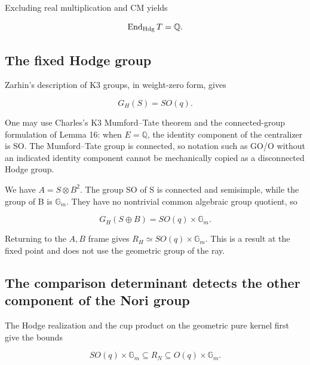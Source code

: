 \documentclass[11pt,a4paper,oneside]{article}
\theoremstyle{plain}
\theoremstyle{definition}
\theoremstyle{remark}
\newcommand{\Gm}{\mathbb G_m}
\numberwithin{equation}{section}
\begin{document}
Excluding real multiplication and CM yields

\begin{equation}
\operatorname{End}_{\rm Hdg}T=\mathbb Q.
                                                                    \label{eq:fixed:8}
\end{equation}


\subsection{The fixed Hodge group}\label{sec:fixed:5}

Zarhin's description of K3 groups, in weight-zero form, gives

\begin{equation}
G_H(S)=SO(q).                           \label{eq:fixed:9}
\end{equation}

One may use Charles's K3 Mumford--Tate theorem and the connected-group formulation of Lemma 16: when \(E=\)\(\mathbb Q\), the identity component of the centralizer is SO. The Mumford--Tate group is connected, so notation such as GO/O without an indicated identity component cannot be mechanically copied as a disconnected Hodge group.

We have \(A=S\otimes B^{2}\). The group SO of S is connected and semisimple, while the group of B is \(\mathbb G_m\). They have no nontrivial common algebraic group quotient, so

\begin{equation}
G_H(S\oplus B)=SO(q)\times\mathbb G_m.
\end{equation}

Returning to the $A,B$ frame gives $R_H\simeq SO(q)\times\Gm$. This is a result at the fixed point and does not use the geometric group of the ray.


\subsection{The comparison determinant detects the other component of the Nori group}\label{sec:fixed:6}

The Hodge realization and the cup product on the geometric pure kernel first give the bounds

\begin{equation}
SO(q)\times\mathbb G_m
   \subseteq R_N
   \subseteq O(q)\times\mathbb G_m.                               \label{eq:fixed:10}
\end{equation}
\end{document}

